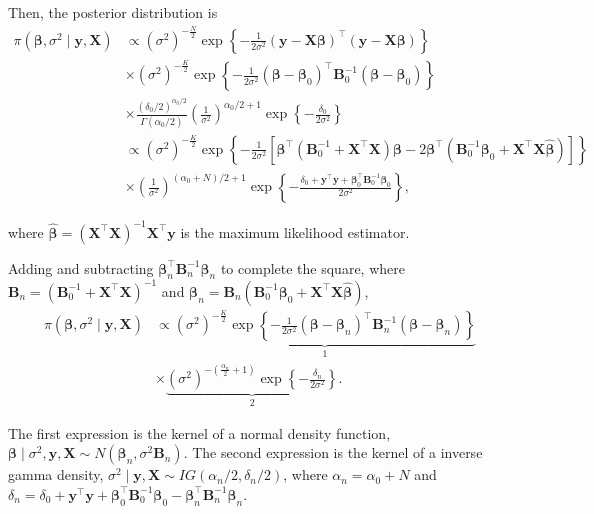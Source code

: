 Then, the posterior distribution is
\begin{align*}
	\pi(\bm{\beta},\sigma^2\mid \bm{y},\bm{X})&\propto (\sigma^2)^{-\frac{N}{2}} \exp \left\{-\frac{1}{2\sigma^2} ({\bm{y}} - {\bm{X}}\bm{\beta})^{\top}({\bm{y}} - {\bm{X}}\bm{\beta}) \right\} \\
	& \times (\sigma^2)^{-\frac{K}{2}} \exp \left\{-\frac{1}{2\sigma^2} (\bm{\beta} - \bm{\beta}_0)^{\top}{\bm{B}}_0^{-1}(\bm{\beta} - \bm{\beta}_0)\right\} \\
	& \times \frac{(\delta_0/2)^{\alpha_0/2}}{\Gamma(\alpha_0/2)}\left(\frac{1}{\sigma^2}\right)^{\alpha_0/2+1}\exp \left\{-\frac{\delta_0}{2\sigma^2} \right\} \\
	& \propto (\sigma^2)^{-\frac{K}{2}} \exp \left\{-\frac{1}{2\sigma^2} [\bm{\beta}^{\top}({\bm{B}}_0^{-1} + {\bm{X}}^{\top}{\bm{X}})\bm{\beta} - 2\bm{\beta}^{\top}({\bm{B}}_0^{-1}\bm{\beta}_0 + {\bm{X}}^{\top}{\bm{X}}\hat{\bm{\beta}})] \right\} \\
	& \times \left(\frac{1}{\sigma^2}\right)^{(\alpha_0+N)/2+1}\exp \left\{-\frac{\delta_0+ {\bm{y}}^{\top}{\bm{y}} + \bm{\beta}_0^{\top}{\bm{B}}_0^{-1}\bm{\beta}_0}{2\sigma^2} \right\},
\end{align*}

where $\hat{\bm{\beta}}=({\bm{X}}^{\top}{\bm{X}})^{-1}{\bm{X}}^{\top}{\bm{y}}$ is the maximum likelihood estimator.

Adding and subtracting $\bm{\beta}_n^{\top}{{\bm{B}}}_n^{-1} \bm{\beta}_n$ to complete the square, where $\bm{B}_n = (\bm{B}_0^{-1} + \bm{X}^{\top}\bm{X})^{-1}$ and $\bm{\beta}_n = \bm{B}_n(\bm{B}_0^{-1}\bm{\beta}_0 + \bm{X}^{\top}\bm{X}\hat{\bm{\beta}})$,
\begin{align*}
	\pi(\bm{\beta},\sigma^2\mid \bm{y},\bm{X})&\propto \underbrace{(\sigma^2)^{-\frac{K}{2}} \exp \left\{-\frac{1}{2\sigma^2} (\bm{\beta}-\bm{\beta}_n)^{\top}{\bm{B}}^{-1}_n(\bm{\beta}-\bm{\beta}_n) \right\}}_1 \\
	& \times \underbrace{(\sigma^2)^{-\left(\frac{\alpha_n}{2}+1 \right)} \exp \left\{-\frac{\delta_n}{2\sigma^2} \right\}}_2.
\end{align*}

The first expression is the kernel of a normal density function, $\bm{\beta}\mid \sigma^2, \bm{y}, \bm{X} \sim N(\bm{\beta}_n, \sigma^2\bm{B}_n)$. The second expression is the kernel of a inverse gamma density,	$\sigma^2\mid  \bm{y}, \bm{X}\sim IG(\alpha_n/2, \delta_n/2)$, where $\alpha_n = \alpha_0 + N$ and $\delta_n = \delta_0 + \bm{y}^{\top}\bm{y} + \bm{\beta}_0^{\top}\bm{B}_0^{-1}\bm{\beta}_0 - \bm{\beta}_n^{\top}\bm{B}_n^{-1}\bm{\beta}_n$.

